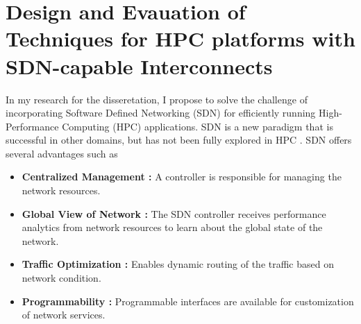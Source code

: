 \chapter{Design and Evauation of Techniques for HPC platforms with SDN-capable Interconnects} In
my research for the disseretation, I propose to solve the challenge of incorporating Software Defined
Networking (SDN) for efficiently running High-Performance Computing (HPC)
applications. SDN is a new paradigm that is successful in other domains, but has not
been fully explored in HPC \cite{kreutz2014software, alalmaei2020sdn, he2016firebird}. 
SDN offers several advantages such as
\begin{itemize}

\item \textbf{Centralized Management :} A controller is responsible for managing the network resources.
\item \textbf{Global View of Network :} The SDN controller receives performance analytics from network resources to learn about the global state of the network.
\item \textbf{Traffic Optimization :} Enables dynamic routing of the traffic based on network condition.
\item \textbf{Programmability :} Programmable interfaces are available for customization of network services.

\end{itemize}
\begin{comment}
All the above advantages can be applied to the HPC environment. 
The goal of this research is to develop and
evaluate SDN techniques for HPC environments. I focus on these five areas which are (1) flow identification where we identify the types network flows, (2) SDN-enabled flow scheduling where we scheduling the different types of network flows, (3) impact of topology and routing schemes where we evaluate how the flow identification and SDN-enabled flow scheduling performs in state-of-the-art HPC topologies along with their respective routings, (4) SDN-aware communication where we try to evaluate if MPI collective communication algorithms can be changed based on the SDN knowledge about the network, and finally (5) SDN-aware job scheduling where we try to evaluate job placements based on SDN knowledge about the network.

The integration of SDN in network flow identification, scheduling, and communication algorithms significantly enhances the efficiency and performance of HPC applications. By accurately classifying and routing elephant and mice flows, SDN reduces network congestion and ensures sufficient bandwidth allocation. Tailored routing algorithms and topology analyses optimize traffic management and scalability. Additionally, SDN-aware communication algorithms and job scheduling improve performance and minimize variability across different network topologies. This comprehensive approach addresses critical challenges in high-demand scenarios, leading to improved network performance and resource utilization
\end{comment}
